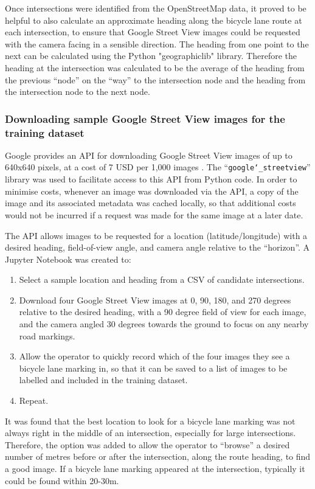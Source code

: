 \documentclass[11pt,twoside]{report}
\begin{document}
Once intersections were identified from the OpenStreetMap data, it proved to be helpful to also calculate an approximate heading along the bicycle lane route at each intersection, to ensure that Google Street View images could be requested with the camera facing in a sensible direction.  The heading from one point to the next can be calculated using the Python "geographiclib" library.  Therefore the heading at the intersection was calculated to be the average of the heading from the previous ``node'' on the ``way'' to the intersection node and the heading from the intersection node to the next node.

\subsubsection{Downloading sample Google Street View images for the training dataset}

Google provides an API for downloading Google Street View images of up to 640x640 pixels, at a cost of 7 USD per 1,000 images \cite{gsv_billing}.  The ``\texttt{google\char`_streetview}'' library was used to facilitate access to this API from Python code.  In order to minimise costs, whenever an image was downloaded via the API, a copy of the image and its associated metadata was cached locally, so that additional costs would not be incurred if a request was made for the same image at a later date.

The API allows images to be requested for a location (latitude/longitude) with a desired heading, field-of-view angle, and camera angle relative to the ``horizon''.  A Jupyter Notebook was created to:

\begin{enumerate}
	\item{Select a sample location and heading from a CSV of candidate intersections.}
	\item{Download four Google Street View images at 0, 90, 180, and 270 degrees relative to the desired heading, with a 90 degree field of view for each image, and the camera angled 30 degrees towards the ground to focus on any nearby road markings.}
	\item{Allow the operator to quickly record which of the four images they see a bicycle lane marking in, so that it can be saved to a list of images to be labelled and included in the training dataset.}
	\item{Repeat.}
\end{enumerate}

It was found that the best location to look for a bicycle lane marking was not always right in the middle of an intersection, especially for large intersections.  Therefore, the option was added to allow the operator to ``browse'' a desired number of metres before or after the intersection, along the route heading, to find a good image.  If a bicycle lane marking appeared at the intersection, typically it could be found within 20-30m.
\end{document}
